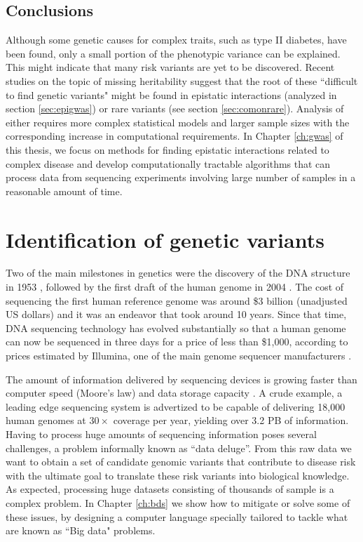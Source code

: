 \subsection{Conclusions}

Although some genetic causes for complex traits, such as type II diabetes, have been found, only a small portion of the phenotypic variance can be explained. 
This might indicate that many risk variants are yet to be discovered. 
Recent studies on the topic of missing heritability suggest that the root of these ``difficult to find genetic variants" might be found in epistatic interactions (analyzed in section \ref{sec:epigwas}) or rare variants (see section \ref{sec:comonrare}). 
Analysis of either requires more complex statistical models and larger sample sizes with the corresponding increase in computational requirements. 
In Chapter \ref{ch:gwas} of this thesis, we focus on methods for finding epistatic interactions related to complex disease and develop computationally tractable algorithms that can process data from sequencing experiments involving large number of samples in a reasonable amount of time.

\section{Identification of genetic variants}

Two of the main milestones in genetics were the discovery of the DNA structure in 1953 \cite{watson1953molecular}, followed by the first draft of the human genome in 2004 \cite{collins2004finishing}. 
The cost of sequencing the first human reference genome was around \$3 billion (unadjusted US dollars) and it was an endeavor that took around 10 years. 
Since that time, DNA sequencing technology has evolved substantially so that a human genome can now be sequenced in three days for a price of less than \$1,000, according to prices estimated by Illumina, one of the main genome sequencer manufacturers \cite{hayden2015is}.

The amount of information delivered by sequencing devices is growing faster than computer speed (Moore's law) and data storage capacity \cite{schatz2010cloud}. 
A crude example, a leading edge sequencing system is advertized to be capable of delivering 18,000 human genomes at $30 \times$ coverage per year, yielding over 3.2 PB of information. 
Having to process huge amounts of sequencing information poses several challenges, a problem informally known as ``data deluge''.
From this raw data we want to obtain a set of candidate genomic variants that contribute to disease risk with the ultimate goal to translate these risk variants into biological knowledge. 
As expected, processing huge datasets consisting of thousands of sample is a complex problem. 
In Chapter \ref{ch:bds} we show how to mitigate or solve some of these issues, by designing a computer language specially tailored to tackle what are known as ``Big data" problems.


